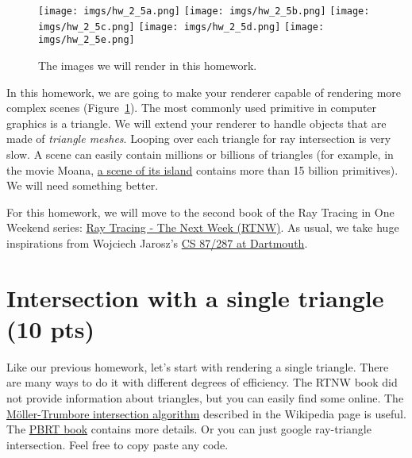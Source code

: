 




\begin{figure}[ht]
    \centering
    \texttt{[image: imgs/hw\_2\_5a.png]}
    \texttt{[image: imgs/hw\_2\_5b.png]}
    \texttt{[image: imgs/hw\_2\_5c.png]}
    \texttt{[image: imgs/hw\_2\_5d.png]}
    \texttt{[image: imgs/hw\_2\_5e.png]}
    \caption{The images we will render in this homework.}
    \label{fig:teaser}
\end{figure}

In this homework, we are going to make your renderer capable of rendering more complex scenes (Figure~\ref{fig:teaser}).
The most commonly used primitive in computer graphics is a triangle. We will extend your renderer to handle objects that are made of \emph{triangle meshes}. Looping over each triangle for ray intersection is very slow. A scene can easily contain millions or billions of triangles (for example, in the movie Moana, \href{https://www.disneyanimation.com/resources/moana-island-scene/}{a scene of its island} contains more than 15 billion primitives). We will need something better.

For this homework, we will move to the second book of the Ray Tracing in One Weekend series: \href{https://raytracing.github.io/books/RayTracingTheNextWeek.html}{Ray Tracing - The Next Week (RTNW)}. As usual, we take huge inspirations from Wojciech Jarosz's \href{https://cs87-dartmouth.github.io/Fall2022/assignments.html}{CS 87/287 at Dartmouth}.

\section{Intersection with a single triangle (10 pts)}
Like our previous homework, let's start with rendering a single triangle. There are many ways to do it with different degrees of efficiency. The RTNW book did not provide information about triangles, but you can easily find some online. The \href{https://en.wikipedia.org/wiki/M%C3%B6ller%E2%80%93Trumbore_intersection_algorithm}{M\"oller-Trumbore intersection algorithm} described in the Wikipedia page is useful. The \href{https://www.pbr-book.org/3ed-2018/Shapes/Triangle_Meshes#TriangleIntersection}{PBRT book} contains more details.
Or you can just google ray-triangle intersection.
Feel free to copy paste any code.

